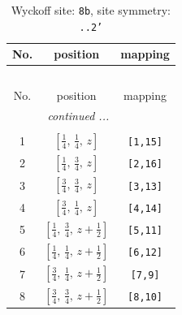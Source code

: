 \documentclass[fleqn,8pt]{jsarticle}
\begin{document}
\begin{longtable}{ccc}
\caption{Wyckoff site: {\tt 8b}, site symmetry: {\tt ..2'}}
 \\
 \hline \hline
No. & position & mapping \\ \hline \endfirsthead

\multicolumn{2}{l}{\tablename\ \thetable{}} \\
 \hline \hline
No. & position & mapping \\ \hline \endhead

 \hline \hline
\multicolumn{2}{r}{\footnotesize\it continued ...} \\ \endfoot

 \hline \hline
\multicolumn{2}{r}{} \\ \endlastfoot

1 & $\left[ \frac{1}{4},\, \frac{1}{4},\, z \right]$ & {\tt [1,15]} \\ \hline
2 & $\left[ \frac{1}{4},\, \frac{3}{4},\, z \right]$ & {\tt [2,16]} \\ \hline
3 & $\left[ \frac{3}{4},\, \frac{3}{4},\, z \right]$ & {\tt [3,13]} \\ \hline
4 & $\left[ \frac{3}{4},\, \frac{1}{4},\, z \right]$ & {\tt [4,14]} \\ \hline
5 & $\left[ \frac{1}{4},\, \frac{3}{4},\, z + \frac{1}{2} \right]$ & {\tt [5,11]} \\ \hline
6 & $\left[ \frac{1}{4},\, \frac{1}{4},\, z + \frac{1}{2} \right]$ & {\tt [6,12]} \\ \hline
7 & $\left[ \frac{3}{4},\, \frac{1}{4},\, z + \frac{1}{2} \right]$ & {\tt [7,9]} \\ \hline
8 & $\left[ \frac{3}{4},\, \frac{3}{4},\, z + \frac{1}{2} \right]$ & {\tt [8,10]} \\
\end{longtable}
\renewcommand{\arraystretch}{1.2}
\end{document}
